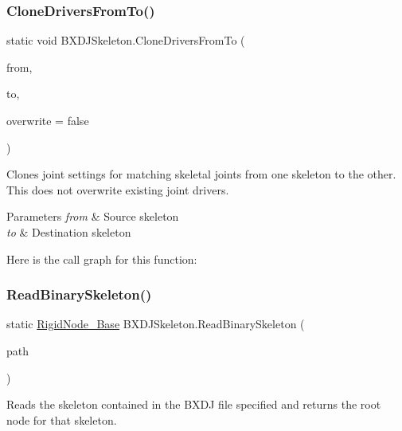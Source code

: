 \subsubsection{\texorpdfstring{Clone\+Drivers\+From\+To()}{CloneDriversFromTo()}}
{\footnotesize\ttfamily static void B\+X\+D\+J\+Skeleton.\+Clone\+Drivers\+From\+To (\begin{DoxyParamCaption}\item[{\hyperlink{class_rigid_node___base}{Rigid\+Node\+\_\+\+Base}}]{from,  }\item[{\hyperlink{class_rigid_node___base}{Rigid\+Node\+\_\+\+Base}}]{to,  }\item[{bool}]{overwrite = {\ttfamily false} }\end{DoxyParamCaption})\hspace{0.3cm}{\ttfamily [static]}}



Clones joint settings for matching skeletal joints from one skeleton to the other. This does not overwrite existing joint drivers. 


\begin{DoxyParams}{Parameters}
{\em from} & Source skeleton\\
\hline
{\em to} & Destination skeleton\\
\hline
\end{DoxyParams}
Here is the call graph for this function\+:
\mbox{\label{class_b_x_d_j_skeleton_aeacead12f7e921a9c77a588773901798}} 
\subsubsection{\texorpdfstring{Read\+Binary\+Skeleton()}{ReadBinarySkeleton()}}
{\footnotesize\ttfamily static \hyperlink{class_rigid_node___base}{Rigid\+Node\+\_\+\+Base} B\+X\+D\+J\+Skeleton.\+Read\+Binary\+Skeleton (\begin{DoxyParamCaption}\item[{string}]{path }\end{DoxyParamCaption})\hspace{0.3cm}{\ttfamily [static]}}



Reads the skeleton contained in the B\+X\+DJ file specified and returns the root node for that skeleton. 


